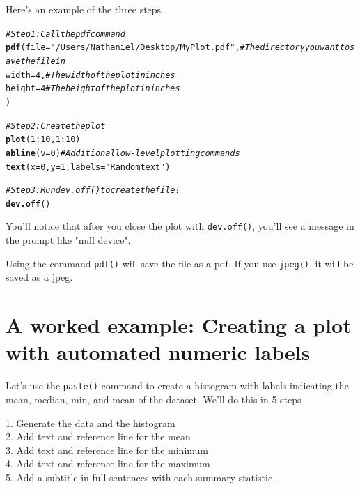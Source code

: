 \documentclass{tufte-book}\usepackage[]{graphicx}\usepackage[]{color}
\makeatletter
\newcommand{\hlnum}[1]{\textcolor[rgb]{0.686,0.059,0.569}{#1}}%
\newcommand{\hlstr}[1]{\textcolor[rgb]{0.192,0.494,0.8}{#1}}%
\newcommand{\hlcom}[1]{\textcolor[rgb]{0.678,0.584,0.686}{\textit{#1}}}%
\newcommand{\hlopt}[1]{\textcolor[rgb]{0,0,0}{#1}}%
\newcommand{\hlstd}[1]{\textcolor[rgb]{0.345,0.345,0.345}{#1}}%
\newcommand{\hlkwc}[1]{\textcolor[rgb]{0.333,0.667,0.333}{#1}}%
\newcommand{\hlkwd}[1]{\textcolor[rgb]{0.737,0.353,0.396}{\textbf{#1}}}%
\newenvironment{kframe}{%
 \def\at@end@of@kframe{}%
 \ifinner\ifhmode%
  \def\at@end@of@kframe{\end{minipage}}%
  \begin{minipage}{\columnwidth}%
 \fi\fi%
 \def\FrameCommand##1{\hskip\@totalleftmargin \hskip-\fboxsep
 \colorbox{shadecolor}{##1}\hskip-\fboxsep
     \hskip-\linewidth \hskip-\@totalleftmargin \hskip\columnwidth}%
 \MakeFramed {\advance\hsize-\width
   \@totalleftmargin\z@ \linewidth\hsize
   \@setminipage}}%
 {\par\unskip\endMakeFramed%
 \at@end@of@kframe}
\newenvironment{knitrout}{}{} %
\makeatother
\begin{document}
\begin{footnotesize}
Here's an example of the three steps.


\begin{knitrout}
\color{fgcolor}\begin{kframe}
\begin{alltt}
\hlcom{# Step 1: Call the pdf command}
\hlkwd{pdf}\hlstd{(}\hlkwc{file} \hlstd{=} \hlstr{"/Users/Nathaniel/Desktop/My Plot.pdf"}\hlstd{,}   \hlcom{# The directory you want to save the file in}
    \hlkwc{width} \hlstd{=} \hlnum{4}\hlstd{,} \hlcom{# The width of the plot in inches}
    \hlkwc{height} \hlstd{=} \hlnum{4} \hlcom{# The height of the plot in inches}
    \hlstd{)}

\hlcom{# Step 2: Create the plot}
\hlkwd{plot}\hlstd{(}\hlnum{1}\hlopt{:}\hlnum{10}\hlstd{,} \hlnum{1}\hlopt{:}\hlnum{10}\hlstd{)}
\hlkwd{abline}\hlstd{(}\hlkwc{v} \hlstd{=} \hlnum{0}\hlstd{)} \hlcom{# Additional low-level plotting commands}
\hlkwd{text}\hlstd{(}\hlkwc{x} \hlstd{=} \hlnum{0}\hlstd{,} \hlkwc{y} \hlstd{=} \hlnum{1}\hlstd{,} \hlkwc{labels} \hlstd{=} \hlstr{"Random text"}\hlstd{)}

\hlcom{# Step 3: Run dev.off() to create the file!}
\hlkwd{dev.off}\hlstd{()}
\end{alltt}
\end{kframe}
\end{knitrout}


You'll notice that after you close the plot with \texttt{dev.off()}, you'll see a message in the prompt like "null device".

Using the command  \texttt{pdf()} will save the file as a pdf. If you use  \texttt{jpeg()}, it will be saved as a jpeg.


\section{A worked example: Creating a plot with automated numeric labels}


Let's use the \texttt{paste()} command to create a histogram with labels indicating the mean, median, min, and mean of the dataset. We'll do this in 5 steps

1. Generate the data and the histogram\\
2. Add text and reference line for the mean\\
3. Add text and reference line for the minimum\\
4. Add text and reference line for the maximum\\
5. Add a subtitle in full sentences with each summary statistic.


\end{footnotesize}
\end{document}

